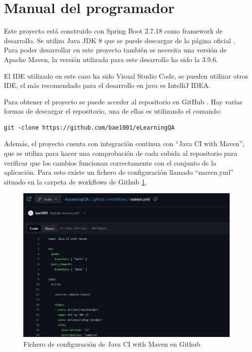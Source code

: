 \section{Manual del programador}
Este proyecto está construido con Spring Boot 2.7.18 como framework de desarrollo. Se utiliza Java JDK 8 que se puede descargar de la página oficial \cite{java8}. Para poder desarrollar en este proyecto también se necesita una versión de Apache Maven, la versión utilizada para este desarrollo ha sido la 3.9.6.

El IDE utilizado en este caso ha sido Visual Studio Code, se pueden utilizar otros IDE, el más recomendado para el desarrollo en java es IntelliJ IDEA. 

Para obtener el proyecto se puede acceder al repositorio en GitHub \cite{repositorio}. Hay varias formas de descargar el repositorio, una de ellas es utilizando el comando: 

\begin{verbatim}
git -clone https://github.com/bae1001/eLearningQA
\end{verbatim}

Además, el proyecto cuenta con integración continua con ``Java CI with Maven'', que se utiliza para hacer una comprobación de cada subida al repositorio para verificar que los cambios funcionan correctamente con el conjunto de la aplicación. Para esto existe un fichero de configuración llamado ``maven.yml'' situado en la carpeta de workflows de Github \ref{fig:mvn-ci}.

\begin{figure}[H]
    \centering
    \includegraphics[width=1\linewidth]{img/javaCi_github.png}
    \caption{Fichero de configuración de Java CI with Maven en Github}
    \label{fig:mvn-ci}
\end{figure}

